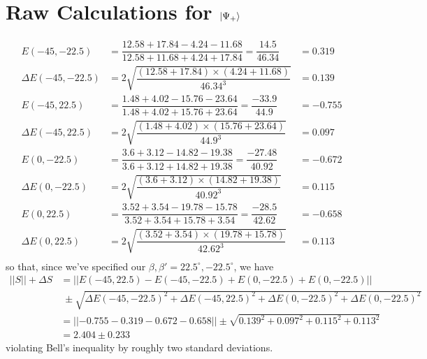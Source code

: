 \documentclass[aps,prl,nofootinbib,twocolumn,superscriptaddress,groupedaddress]{revtex4}  %
\begin{document}
\section{Raw Calculations for $\ket{\Psi_{+}}$}
\begin{align*}
E(-45, -22.5) &= \dfrac{12.58 + 17.84 - 4.24 - 11.68}{12.58 + 11.68 + 4.24 + 17.84} = \dfrac{14.5}{46.34} &= 0.319\\
\Delta E(-45, -22.5) &= 2\sqrt{\dfrac{(12.58 + 17.84)\times(4.24 + 11.68)}{46.34^{3}}} &= 0.139\\
E(-45, 22.5) &= \dfrac{1.48 + 4.02 - 15.76 - 23.64}{1.48 + 4.02 + 15.76 + 23.64} = \dfrac{-33.9}{44.9} &= -0.755\\
\Delta E(-45, 22.5) &= 2\sqrt{\dfrac{(1.48 + 4.02)\times(15.76 + 23.64)}{44.9^{3}}} &= 0.097\\
E(0,-22.5) &= \dfrac{3.6 + 3.12 - 14.82 - 19.38}{3.6 + 3.12 + 14.82 + 19.38} = \dfrac{-27.48}{40.92} &= -0.672\\
\Delta E(0, -22.5) &= 2\sqrt{\dfrac{(3.6 + 3.12)\times(14.82 + 19.38)}{40.92^{3}}} &= 0.115\\
E(0,22.5) &= \dfrac{3.52 + 3.54 - 19.78 - 15.78}{3.52 + 3.54 + 15.78 + 3.54} = \dfrac{-28.5}{42.62} &= -0.658\\
\Delta E(0,22.5) &= 2\sqrt{\dfrac{(3.52 + 3.54)\times(19.78 + 15.78)}{42.62^{3}}} &= 0.113\\
\end{align*}
\noindent so that, since we've specified our $\beta,\beta' = 22.5^{\circ}, -22.5^{\circ}$, we have
\begin{align*}
\lvert| S \rvert| + \Delta S &= \lvert|E(-45, 22.5) - E(-45, -22.5) + E(0,-22.5) + E(0,-22.5)\rvert|\\
&\;\pm \sqrt{\Delta E(-45, -22.5)^{2} + \Delta E(-45, 22.5)^{2} + \Delta E(0,-22.5)^{2} + \Delta E(0,-22.5)^{2}}\\
&= \lvert|-0.755 - 0.319 - 0.672 - 0.658 \rvert| \pm \sqrt{0.139^{2} + 0.097^{2} + 0.115^{2} + 0.113^{2}}\\
&= 2.404 \pm 0.233
\end{align*}
\noindent violating Bell's inequality by roughly two standard deviations.
\end{document}
